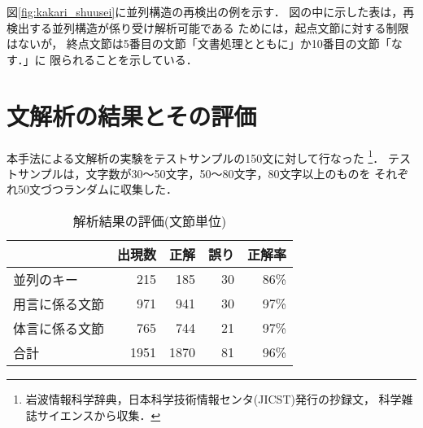図\ref{fig:kakari_shuusei}に並列構造の再検出の例を示す．
図の中に示した表は，再検出する並列構造が係り受け解析可能である
ためには，起点文節に対する制限はないが，
終点文節は5番目の文節「文書処理とともに」か10番目の文節「なす．」に
限られることを示している．

\section{文解析の結果とその評価} \label{sec:evaluation}

本手法による文解析の実験をテストサンプルの150文に対して行なった
\footnote{
岩波情報科学辞典，日本科学技術情報センタ(JICST)発行の抄録文，
科学雑誌サイエンスから収集．
}．
テストサンプルは，文字数が30〜50文字，50〜80文字，80文字以上のものを
それぞれ50文づつランダムに収集した．

\begin{table}
\caption{解析結果の評価(文節単位)}
\label{tab:hyouka}
\begin{center}
\begin{tabular}[c]{l|r|r|r|r} \hline
               & 出現数 & 正解 & 誤り & 正解率 \\ \hline \hline
並列のキー     &  215 &  185 & 30 & 86\% \\ \hline
用言に係る文節 &  971 &  941 & 30 & 97\% \\ \hline
体言に係る文節 &  765 &  744 & 21 & 97\% \\ \hline \hline
合計           & 1951 & 1870 & 81 & 96\% \\ \hline
\end{tabular}
\end{center}
\end{table}

